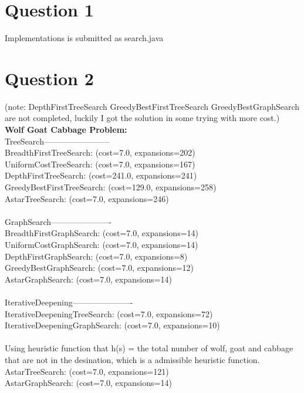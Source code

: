 \documentclass[letterpaper, 12pt]{artikel3}
\begin{document}
\section*{Question 1}
Implementations is submitted as search.java

\section*{Question 2}
(note: DepthFirstTreeSearch GreedyBestFirstTreeSearch GreedyBestGraphSearch are not completed, luckily I got the solution in some trying with more cost.)\\
\textbf{Wolf Goat Cabbage Problem:}\\
TreeSearch------------------------\\
BreadthFirstTreeSearch:		(cost=7.0, expansions=202)\\
UniformCostTreeSearch:		(cost=7.0, expansions=167)	\\
DepthFirstTreeSearch:		(cost=241.0, expansions=241) \\ 
GreedyBestFirstTreeSearch:	(cost=129.0, expansions=258) \\
AstarTreeSearch:		(cost=7.0, expansions=246)\\
\\
GraphSearch----------------------\\
BreadthFirstGraphSearch:	(cost=7.0, expansions=14) \\
UniformCostGraphSearch:		(cost=7.0, expansions=14)	\\
DepthFirstGraphSearch:		(cost=7.0, expansions=8)	\\ 
GreedyBestGraphSearch:		(cost=7.0, expansions=12)	\\ 
AstarGraphSearch:		(cost=7.0, expansions=14)	\\ 
\\
IterativeDeepening----------------------\\
IterativeDeepeningTreeSearch:	(cost=7.0, expansions=72)	\\ 
IterativeDeepeningGraphSearch:	(cost=7.0, expansions=10)	\\ 
\\
Using heuristic function that h(s) =  the total number of wolf, goat and cabbage that are not in the desination, which is a admissible heuristic function.
\\
AstarTreeSearch:		(cost=7.0, expansions=121)\\
AstarGraphSearch:		(cost=7.0, expansions=14)	\\
\end{document}
